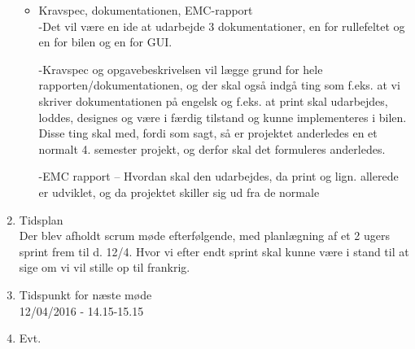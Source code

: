 \begin{enumerate}
\begin{itemize}
			\item Kravspec, dokumentationen, EMC-rapport\\
			-Det vil være en ide at udarbejde 3 dokumentationer, en for rullefeltet og en for bilen og en for GUI.  
			
			-Kravspec og opgavebeskrivelsen vil lægge grund for hele rapporten/dokumentationen, og der skal også indgå ting som f.eks. at vi skriver dokumentationen på engelsk og f.eks. at print skal udarbejdes, loddes, designes og være i færdig tilstand og kunne implementeres i bilen. Disse ting skal med, fordi som sagt, så er projektet anderledes en et normalt 4. semester projekt, og derfor skal det formuleres anderledes. 
			
			-EMC rapport – Hvordan skal den udarbejdes, da print og lign. allerede er udviklet, og da projektet skiller sig ud fra de normale 
			
			
		\end{itemize}			
			
		\item Tidsplan\\
			Der blev afholdt scrum møde efterfølgende, med planlægning af et 2 ugers sprint frem til d. 12/4. Hvor vi efter endt sprint skal kunne være i stand til at sige om vi vil stille op til frankrig. 

		\item Tidspunkt for næste møde\\
			12/04/2016 - 14.15-15.15
		\item Evt.
	\end{enumerate}
